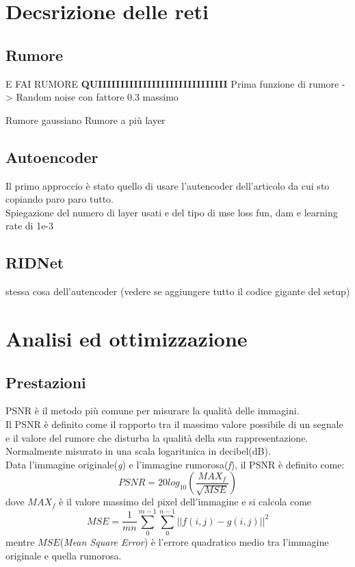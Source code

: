 \documentclass[12pt,a4paper,openright,twoside]{book}
\newcommand{\TODOComment}[1]{}
\begin{document}
\chapter{Decsrizione delle reti}
\section{Rumore}
E FAI RUMORE \textbf{QUIIIIIIIIIIIIIIIIIIIIIIIIIIIII}
Prima funzione di rumore -> Random noise con fattore 0.3 massimo
\TODOComment{questi 2 più avanti}
Rumore gaussiano 
Rumore a più layer


\section{Autoencoder}
Il primo approccio è stato quello di usare l'autencoder dell'articolo da cui sto copiando paro paro tutto.\\
Spiegazione del numero di layer usati e del tipo di mse loss fun, dam e learning rate di 1e-3

\TODOComment{Modificare il dataset per i cosi successivi}

\section{RIDNet}
stessa cosa dell'autencoder (vedere se aggiungere tutto il codice gigante del setup)


\chapter{Analisi ed ottimizzazione}
\section{Prestazioni}
PSNR è il metodo più comune per misurare la qualità delle immagini.\\
Il PSNR è definito come il rapporto tra il massimo valore possibile di un segnale e il valore del rumore che disturba la qualità della sua rappresentazione.\\ Normalmente misurato in una scala logaritmica in decibel(dB).\\
Data l'immagine originale(\textit{g}) e l'immagine rumorosa(\textit{f}), il PSNR è definito come: \[PSNR=20log_{10}(\frac{MAX_f}{\sqrt{MSE}})\] dove $MAX_f$ è il valore massimo del pixel dell'immagine e si calcola come \[MSE=\frac{1}{mn}\sum_{0}^{m-1}\sum_{0}^{n-1}||f(i,j)-g(i,j)||^2  \] mentre $MSE$(\textit{Mean Square Error}) è l'errore quadratico medio tra l'immagine originale e quella rumorosa.\\
\end{document}
